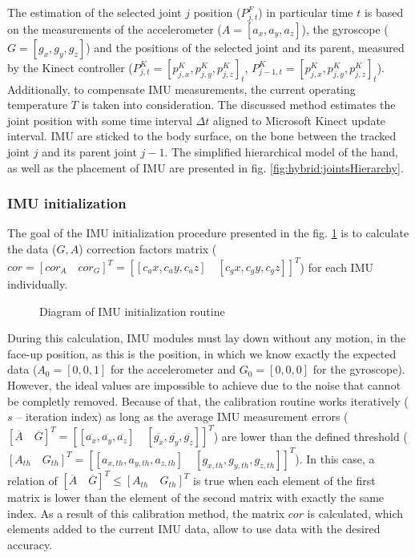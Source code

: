 \documentclass[sensors,article,submit,moreauthors,pdftex,10pt,a4paper]{mdpi}
\begin{document}
The estimation of the selected joint $j$ position ($P^F_{j,t}$) in particular time $t$ is based on the measurements of the accelerometer ($A=[a_x,a_y,a_z]$), the gyroscope ($G=[g_x,g_y,g_z]$) and the positions of the selected joint and its parent, measured by the Kinect controller ($P^K_{j,t} = [p^K_{j,x}, p^K_{j,y}, p^K_{j,z}]_t$, $P^K_{j-1,t} = [p^K_{j,x}, p^K_{j,y}, p^K_{j,z}]_t$). Additionally, to compensate IMU measurements, the current operating temperature $T$ is taken into consideration. The discussed method estimates the joint position with some time interval $\Delta t$ aligned to Microsoft Kinect update interval. IMU are sticked to the body surface, on the bone between the tracked joint $j$ and its parent joint $j-1$. The simplified hierarchical model of the hand, as well as the placement of IMU are presented in fig. \ref{fig:hybrid:jointsHierarchy}.	
	
	\subsubsection{IMU initialization}
	The goal of the IMU initialization procedure presented in the fig. \ref{fig:hybrid:IMUCalibration} is to calculate the data ($G, A$) correction factors matrix ($cor = [cor_A \quad cor_G]^T = [[c_ax,c_ay,c_az ]\quad[c_gx,c_gy,c_gz ]]^T $) for each IMU individually. 

		\begin{figure}[!htb]
	\scalebox{0.55}{		
		
	}
	\caption{Diagram of IMU initialization routine}
	\label{fig:hybrid:IMUCalibration}
\end{figure}

	During this calculation, IMU modules must lay down without any motion, in the face-up position, as this is the position, in which we know exactly the expected data ($A_0=[0,0,1]$ for the accelerometer and $G_0=[0,0,0]$ for the gyroscope). However, the ideal values are impossible to achieve due to the noise that cannot be completly removed. Because of that, the calibration routine works iteratively ($s$ -- iteration index) as long as the average IMU measurement errors ($[\overline{A}\quad \overline{G}]^T = [[\overline{a_x},\overline{a_y},\overline{a_z}]\quad[\overline{g_x},\overline{g_y},\overline{g_z}]]^T$) are lower than the defined threshold ($[A_{th}\quad G_{th}]^T = [[a_{x,th},a_{y,th},a_{z,th}]\quad[g_{x,th},g_{y,th},g_{z,th}]]^T$). In this case, a relation of $[\overline{A}\quad \overline{G}]^T \le [A_{th}\quad G_{th}]^T$ is true when each element of the first matrix is lower than the element of the second matrix with exactly the same index. As a result of this calibration method, the matrix $cor$ is calculated, which elements added to the current IMU data, allow to use data with the desired accuracy. 
	
\end{document}
